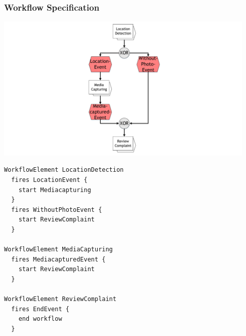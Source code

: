 
\begin{frame}
	\plainnumber
	\frametitle{Workflow Specification}
	
	\begin{minipage}{0.45\textwidth}
	    		        \includegraphics[height = 7cm, trim = 10cm 0cm 10cm 0cm, clip = true]{images/WorkflowSpecification.pdf}	  
	\end{minipage}\hfill
	\begin{minipage}{0.5\textwidth}
\begin{lstlisting}
WorkflowElement LocationDetection
  fires LocationEvent {
    start Mediacapturing
  }
  fires WithoutPhotoEvent {
    start ReviewComplaint
  }

WorkflowElement MediaCapturing
  fires MediacapturedEvent {
    start ReviewComplaint
  }

WorkflowElement ReviewComplaint
  fires EndEvent {
    end workflow
  }
\end{lstlisting}
\end{minipage}

\end{frame}


